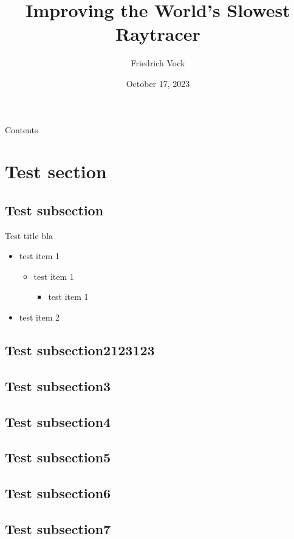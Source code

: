 \documentclass[aspectratio=169,t]{beamer}
\author{Friedrich Vock}
\title{Improving the World's Slowest Raytracer}
\date{October 17, 2023}
\begin{document}
\begin{slide}
\titlepage
\end{slide}


\begin{slide}{Contents}
\tableofcontents
\end{slide}

\section{Test section}
\subsection{Test subsection}

\begin{slide}{Test title}
    bla
    \begin{itemize}
     \item test item 1
        \begin{itemize}
            \setlength{\itemindent}{-1em}
            \item test item 1

        \begin{itemize}
            \setlength{\itemindent}{-2em}
            \item test item 1
        \end{itemize}
        \end{itemize}
     \item test item 2
    \end{itemize}
\end{slide}
\subsection{Test subsection2123123}
\subsection{Test subsection3}
\subsection{Test subsection4}
\subsection{Test subsection5}
\subsection{Test subsection6}
\subsection{Test subsection7}

\begin{frame}
\end{frame}
\end{document}
